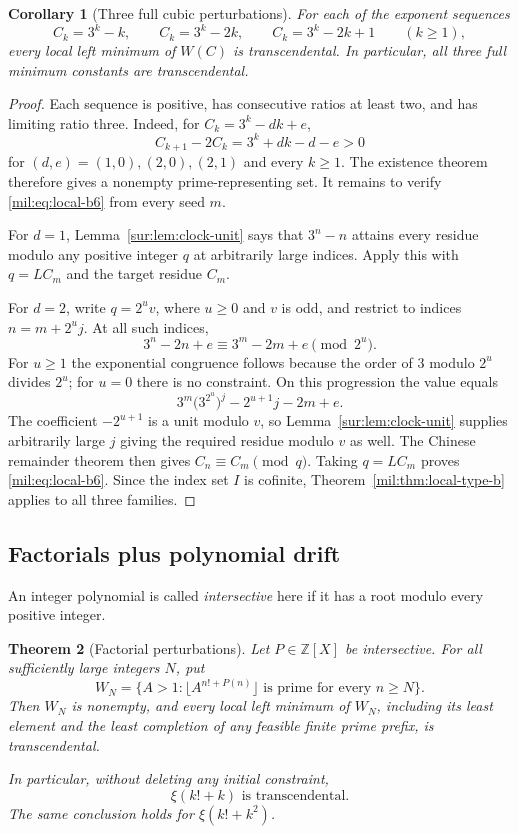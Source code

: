 \documentclass[11pt,a4paper]{article}
\newtheorem{theorem}{Theorem}[section]
\newtheorem{corollary}[theorem]{Corollary}
\theoremstyle{definition}
\theoremstyle{remark}
\numberwithin{equation}{section}
\begin{document}
\begin{corollary}[Three full cubic perturbations]\label{mil:cor:original-cubic-perturbations}
For each of the exponent sequences
\[
 C_k=3^k-k,\qquad C_k=3^k-2k,\qquad C_k=3^k-2k+1
 \qquad(k\ge1),
\]
every local left minimum of $W(C)$ is transcendental. In particular,
all three full minimum constants are transcendental.
\end{corollary}
\begin{proof}
Each sequence is positive, has consecutive ratios at least two,
and has limiting ratio three. Indeed, for $C_k=3^k-dk+e$,
\[
 C_{k+1}-2C_k=3^k+dk-d-e>0
\]
for $(d,e)=(1,0),(2,0),(2,1)$ and every $k\ge1$.
The existence theorem therefore gives a nonempty prime-representing set.
It remains to verify \eqref{mil:eq:local-b6} from every seed $m$.

For $d=1$, Lemma~\ref{sur:lem:clock-unit} says that $3^n-n$ attains
every residue modulo any positive integer $q$ at arbitrarily large
indices. Apply this with $q=LC_m$ and the target residue $C_m$.

For $d=2$, write $q=2^u v$, where $u\ge0$ and $v$ is odd, and
restrict to indices $n=m+2^u j$. At all such indices,
\[
 3^n-2n+e\equiv3^m-2m+e\pmod{2^u}.
\]
For $u\ge1$ the exponential congruence follows because the order of
$3$ modulo $2^u$ divides $2^u$; for $u=0$ there is no constraint.
On this progression the value equals
\[
 3^m\bigl(3^{2^u}\bigr)^j-2^{u+1}j-2m+e.
\]
The coefficient $-2^{u+1}$ is a unit modulo $v$, so
Lemma~\ref{sur:lem:clock-unit} supplies arbitrarily large $j$ giving the
required residue modulo $v$ as well. The Chinese remainder theorem
then gives $C_n\equiv C_m\pmod q$. Taking $q=LC_m$ proves
\eqref{mil:eq:local-b6}. Since the index set $I$ is cofinite,
Theorem~\ref{mil:thm:local-type-b} applies to all three families.
\end{proof}

\subsection{Factorials plus polynomial drift}

An integer polynomial is called \emph{intersective} here if it has a root modulo every positive integer.

\begin{theorem}[Factorial perturbations]
\label{mil:thm:factorial-drift}
Let $P\in\mathbb Z[X]$ be intersective. For all sufficiently large integers $N$, put
\[
 W_N=\{A>1:\lfloor A^{n!+P(n)}\rfloor
 \text{ is prime for every }n\geq N\}.
\]
Then $W_N$ is nonempty, and every local left minimum of $W_N$, including its least element and the least completion of any feasible finite prime prefix, is transcendental.

In particular, without deleting any initial constraint,
\[
 \boxed{\xi(k!+k)\text{ is transcendental}.}
\]
The same conclusion holds for $\xi(k!+k^2)$.
\end{theorem}
\end{document}
